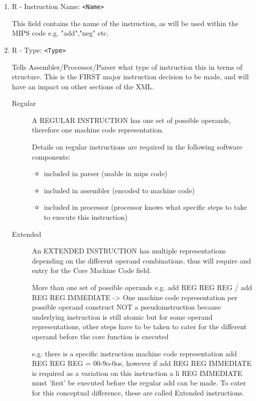 \begin{enumerate}
\setcounter{enumi}{0}


\item R - Instruction Name: \verb"<Name>"

This field contains the name of the instruction, as will be used within the MIPS code e.g. "add","neg" etc.


\item R - Type: \verb"<Type>"

Tells Assembler/Processor/Parser what type of instruction this in terms of structure. This is the FIRST major instruction decision to be made, and will have an impact on other sections of the XML.



\begin{description}

\item[Regular]

A REGULAR INSTRUCTION has one set of possible operands, therefore one machine code representation.

Details on regular instructions are required in the following software components:
\begin{itemize}
\item included in parser (usable in mips code)
\item included in assembler (encoded to machine code)
\item included in processor (processor knows what specific steps to take to execute this instruction)
\end{itemize}

\item[Extended]

An EXTENDED INSTRUCTION has multiple representations depending on the different operand combinations, thus will require and entry for the Core Machine Code field.

More than one set of possible operands e.g. add REG REG REG / add REG REG IMMEDIATE -> One machine code representation per possible operand construct NOT a pseudoinstruction because underlying instruction is still atomic but for some operand representations, other steps have to be taken to cater for the different operand before the core function is executed

e.g. there is a specific instruction machine code representation add REG REG REG = 00-9o-0os, however if add REG REG IMMEDIATE is required as a variation on this instruction a li REG IMMEDIATE must 'first' be executed before the regular add can be made. To cater for this	conceptual difference, these are called Extended instructions.


\end{description}
\end{enumerate}
